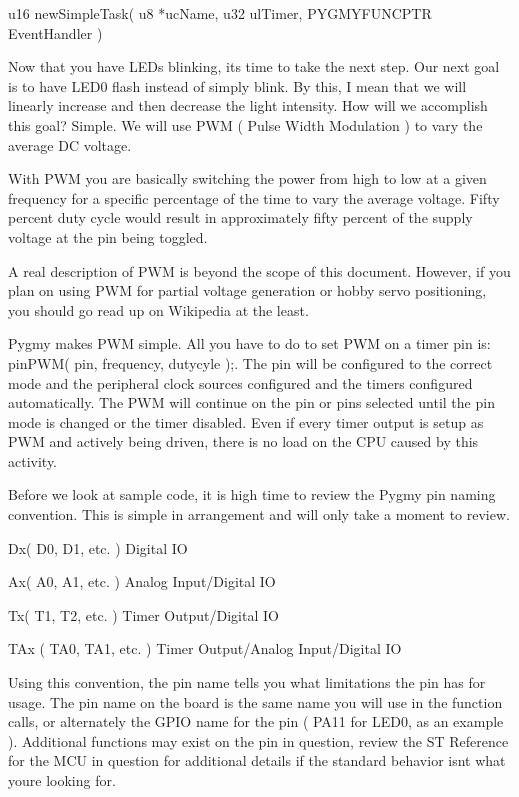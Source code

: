\documentclass{article}
\begin{document}
u16 newSimpleTask( u8 *ucName, u32 ulTimer, PYGMYFUNCPTR EventHandler )


\bigskip

Now that you have LEDs blinking, it{\textquotesingle}s time to take the next step. Our next goal is to have LED0 flash instead of simply blink. By this, I mean that we will linearly increase and then decrease the light intensity. How will we accomplish this goal? Simple. We will use PWM ( Pulse Width Modulation ) to vary the average DC voltage.

With PWM you are basically switching the power from high to low at a given frequency for a specific percentage of the time to vary the average voltage. Fifty percent duty cycle would result in approximately fifty percent of the supply voltage at the pin being toggled.

A real description of PWM is beyond the scope of this document. However, if you plan on using PWM for partial voltage generation or hobby servo positioning, you should go read up on Wikipedia at the least.

Pygmy makes PWM simple. All you have to do to set PWM on a timer pin is: pinPWM( pin, frequency, dutycyle );. The pin will be configured to the correct mode and the peripheral clock sources configured and the timers configured automatically. The PWM will continue on the pin or pins selected until the pin mode is changed or the timer disabled. Even if every timer output is setup as PWM and actively being driven, there is no load on the CPU caused by this activity.

Before we look at sample code, it is high time to review the Pygmy pin naming convention. This is simple in arrangement and will only take a moment to review.

Dx( D0, D1, etc. ) Digital IO

Ax( A0, A1, etc. ) Analog Input/Digital IO

Tx( T1, T2, etc. ) Timer Output/Digital IO

TAx ( TA0, TA1, etc. ) Timer Output/Analog Input/Digital IO


\bigskip

Using this convention, the pin name tells you what limitations the pin has for usage. The pin name on the board is the same name you will use in the function calls, or alternately the GPIO name for the pin ( PA11 for LED0, as an example ). Additional functions may exist on the pin in question, review the ST Reference for the MCU in question for additional details if the standard behavior isn{\textquotesingle}t what you{\textquotesingle}re looking for.
\end{document}
